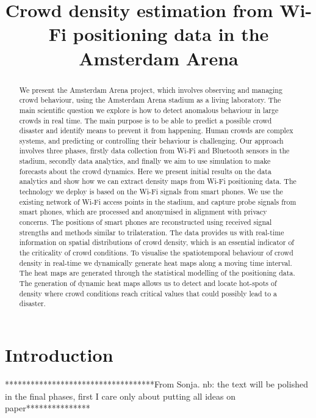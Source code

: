\documentclass[10pt,a4paper]{article}
\begin{document}
\title{Crowd density estimation from Wi-Fi positioning data in the Amsterdam Arena}
\maketitle

\begin{abstract}
We present the Amsterdam Arena project, which involves observing and managing crowd behaviour, using the Amsterdam Arena stadium as a living laboratory. The main scientific question we explore is how to detect anomalous behaviour in large crowds in real time. The main purpose is to be able to predict a possible crowd disaster and identify means to prevent it from happening. 
Human crowds are complex systems, and predicting or controlling their behaviour is challenging. Our approach involves three phases, firstly data collection from Wi-Fi and Bluetooth sensors in the stadium, secondly data analytics, and finally we aim to use simulation to make forecasts about the crowd dynamics. 
Here we present initial results on the data analytics and show how we can extract density maps from Wi-Fi positioning data. The technology we deploy is based on the Wi-Fi signals from smart phones. We use the existing network of Wi-Fi access points in the stadium, and capture probe signals from smart phones, which are processed and anonymised in alignment with privacy concerns. The positions of smart phones are reconstructed using received signal strengths and methods similar to trilateration. The data provides us with real-time information on spatial distributions of crowd density, which is an essential indicator of the criticality of crowd conditions. To visualise the spatiotemporal behaviour of crowd density in real-time we dynamically generate heat maps along a moving time interval. The heat maps are generated through the statistical modelling of the positioning data. The generation of dynamic heat maps allows us to detect and locate hot-spots of density where crowd conditions reach critical values that could possibly lead to a disaster.
\end{abstract}

\section{Introduction}


***********************************From Sonja. nb: the text will be polished in the final phases, first I care only about putting all ideas on paper***************
\end{document}
